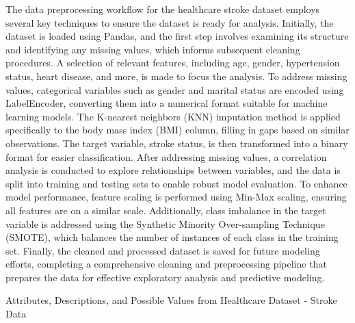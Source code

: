 \documentclass[runningheads]{llncs}
\begin{document}
\begin{enumerate}
The data preprocessing workflow for the healthcare stroke dataset employs several key techniques to ensure the dataset is ready for analysis. Initially, the dataset is loaded using Pandas, and the first step involves examining its structure and identifying any missing values, which informs subsequent cleaning procedures. A selection of relevant features, including age, gender, hypertension status, heart disease, and more, is made to focus the analysis. To address missing values, categorical variables such as gender and marital status are encoded using LabelEncoder, converting them into a numerical format suitable for machine learning models. The K-nearest neighbors (KNN) imputation method is applied specifically to the body mass index (BMI) column, filling in gaps based on similar observations. The target variable, stroke status, is then transformed into a binary format for easier classification. After addressing missing values, a correlation analysis is conducted to explore relationships between variables, and the data is split into training and testing sets to enable robust model evaluation. To enhance model performance, feature scaling is performed using Min-Max scaling, ensuring all features are on a similar scale. Additionally, class imbalance in the target variable is addressed using the Synthetic Minority Over-sampling Technique (SMOTE), which balances the number of instances of each class in the training set. Finally, the cleaned and processed dataset is saved for future modeling efforts, completing a comprehensive cleaning and preprocessing pipeline that prepares the data for effective exploratory analysis and predictive modeling.



\begin{table}[ht]
\centering    
\caption{Attributes, Descriptions, and Possible Values from Healthcare Dataset - Stroke Data} 
\label{tab1} 


\end{table}
\end{enumerate}
\end{document}
